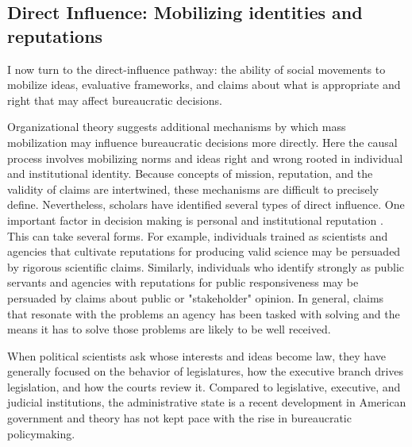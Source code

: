 \subsection{Direct Influence: Mobilizing identities and reputations}

I now turn to the direct-influence pathway: the ability of social movements to mobilize ideas, evaluative frameworks, and claims about what is appropriate and right that may affect bureaucratic decisions. %

Organizational theory suggests additional mechanisms by which mass mobilization may influence bureaucratic decisions more directly. Here the causal process involves mobilizing norms and ideas right and wrong rooted in individual and institutional identity. Because concepts of mission, reputation, and the validity of claims are intertwined, these mechanisms are difficult to precisely define. Nevertheless, scholars have identified several types of direct influence. One important factor in decision making is personal and institutional reputation \citep{Carpenter2001}. This can take several forms. For example, individuals trained as scientists and agencies that cultivate reputations for producing valid science may be persuaded by rigorous scientific claims. Similarly, individuals who identify strongly as public servants and agencies with reputations for public responsiveness may be persuaded by claims about public or "stakeholder" opinion. In general, claims that resonate with the problems an agency has been tasked with solving and the means it has to solve those problems are likely to be well received.  

When political scientists ask whose interests and ideas become law, they have generally focused on the behavior of legislatures, how the executive branch drives legislation, and how the courts review it. Compared to legislative, executive, and judicial institutions, the administrative state is a recent development in American government and theory has not kept pace with the rise in bureaucratic policymaking. 

